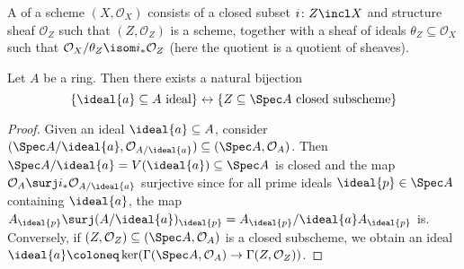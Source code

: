 \documentclass[wip, algebra]{bsteffan-lecturenotes}
\newcommand{\cO}{\mathcal{O}}
\begin{document}
\begin{definition}
	A  of a scheme $(X, \cO_X)$ consists of a closed subset $i\colon Z \incl X$ and structure sheaf $\cO_Z$ such that $(Z, \cO_Z)$ is a scheme, together with a sheaf of ideals $\theta_Z \subseteq \cO_X$ such that $\cO_X / \theta_Z \isom i_* \cO_Z$ (here the quotient is a quotient of sheaves).
\end{definition}
\begin{proposition}
	Let $A$ be a ring.
	Then there exists a natural bijection
	\begin{equation*}
		\{\ideal{a} \subseteq A \text{ ideal}\} \leftrightarrow \{Z \subseteq \Spec A \text{ closed subscheme}\}
	\end{equation*}
\end{proposition}
\begin{proof}
	Given an ideal $\ideal{a} \subseteq A$, consider $(\Spec A / \ideal{a}, \cO_{A / \ideal{a}}) \subseteq (\Spec A, \cO_A)$.
	Then $\Spec A / \ideal{a} = V(\ideal{a}) \subseteq \Spec A$ is closed and the map $\cO_A \surj i_* \cO_{A / \ideal{a}}$ surjective since for all prime ideals $\ideal{p} \in \Spec A$ containing $\ideal{a}$, the map $A_{\ideal{p}} \surj (A / \ideal{a})_{\ideal{p}} = A_{\ideal{p}} / \ideal{a} A_{\ideal{p}}$ is.
	Conversely, if $(Z, \cO_Z) \subseteq (\Spec A, \cO_A)$ is a closed subscheme, we obtain an ideal $\ideal{a} \coloneq \ker(\Gamma(\Spec A, \cO_A) \to \Gamma(Z, \cO_Z))$.


\end{proof}
\end{document}

